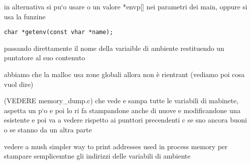 in alternativa si pu`o usare o un valore *envp[] nei parametri dei main, oppure si usa la funzine 

\begin{lstlisting}
char *getenv(const vhar *name);
\end{lstlisting}

passando direttamente il nome della variaible di ambiente restituendo un puntatore al suo contenuto

abbiamo che la malloc usa zone globali allora non è rientrant (vediamo poi cosa vuol dire)

(VEDERE memory\_dump.c) che vede e sampa tutte le variabili di mabinete, aspetta un p`o e poi lo ri fa stampandone anche di nuove e modificandone una esistente e poi va a vedere rispetto ai punttori precendenti c se sno ancora buoni  o se stanno da un altra parte 

vedere a mush simpler way to print addresses used in process memory per stampare semplicemtne gli indirizzi delle variabili di ambiente